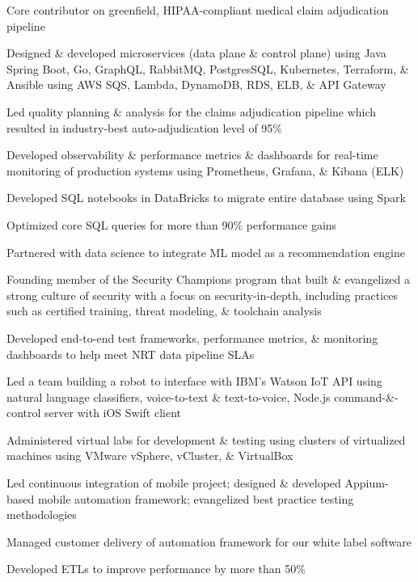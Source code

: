 \documentclass[]{resume}
\begin{document}
\begin{minipage}[t]{0.55\textwidth}
\begin{tightemize}
\item Core contributor on greenfield, HIPAA-compliant medical claim adjudication pipeline 
\item Designed \& developed microservices (data plane \& control plane) using Java Spring Boot, Go, GraphQL, RabbitMQ, PostgresSQL, Kubernetes, Terraform, \& Ansible using AWS SQS, Lambda, DynamoDB, RDS, ELB, \& API Gateway  
\item Led quality planning \& analysis for the claims adjudication pipeline which resulted in industry-best auto-adjudication level of 95\%
\item Developed observability \& performance metrics \& dashboards for real-time monitoring of production systems using Prometheus, Grafana, \& Kibana (ELK)
\item Developed SQL notebooks in DataBricks to migrate entire database using Spark 
\item Optimized core SQL queries for more than 90\% performance gains
\item Partnered with data science to integrate ML model as a recommendation engine
\item Founding member of the Security Champions program that built \& evangelized a strong culture of security with a focus on security-in-depth, including practices such as certified training, threat modeling, \& toolchain analysis
\end{tightemize}
\sectionsep 

\begin{tightemize}
\item Developed end-to-end test frameworks, performance metrics, \& monitoring dashboards to help meet NRT data pipeline SLAs
\end{tightemize}
\sectionsep 

\begin{tightemize}
\item Led a team building a robot to interface with IBM's Watson IoT API using natural language classifiers, voice-to-text \& text-to-voice, Node.js command-\&-control server with iOS Swift client
\item Administered virtual labs for development \& testing using clusters of virtualized machines using VMware vSphere, vCluster, \& VirtualBox
\item Led continuous integration of mobile project; designed \& developed Appium-based mobile automation framework; evangelized best practice testing methodologies 
\item Managed customer delivery of automation framework for our white label software
\item Developed ETLs to improve performance by more than 50\%
\end{tightemize}
\sectionsep


\end{minipage}
\end{document}
